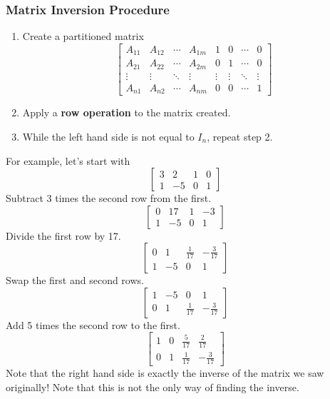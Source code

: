 \documentclass[10pt]{article}
\begin{document}
\subsubsection*{Matrix Inversion Procedure}
\begin{enumerate}
	\item Create a partitioned matrix
	\[\left[\begin{array}{cccc|cccc}
    A_{11} & A_{12} & \cdots & A_{1m} & 1 & 0 & \cdots & 0 \\
    A_{21} & A_{22} & \cdots & A_{2m} & 0 & 1 & \cdots & 0 \\
    \vdots & \vdots & \ddots & \vdots & \vdots & \vdots & \ddots & \vdots \\
    A_{n1} & A_{n2} & \cdots & A_{nm} & 0 & 0 & \cdots & 1
    \end{array}\right]\]
	\item Apply a \textbf{row operation} to the matrix created.
	\item While the left hand side is not equal to $I_n$, repeat step 2.
\end{enumerate}
For example, let's start with 
\[\left[\begin{array}{cc|cc} 3 & 2 & 1 & 0 \\ 1 & -5 & 0 & 1 \end{array}\right]\]
Subtract 3 times the second row from the first.
\[\left[\begin{array}{cc|cc} 0 & 17 & 1 & -3 \\ 1 & -5 & 0 & 1 \end{array}\right]\]
Divide the first row by 17.
\[\left[\begin{array}{cc|cc} 0 & 1 & \frac{1}{17} & -\frac{3}{17} \\ 1 & -5 & 0 & 1 \end{array}\right]\]
Swap the first and second rows.
\[\left[\begin{array}{cc|cc} 1 & -5 & 0 & 1 \\ 0 & 1 & \frac{1}{17} & -\frac{3}{17} \end{array}\right]\]
Add 5 times the second row to the first.
\[\left[\begin{array}{cc|cc} 1 & 0 & \frac{5}{17} & \frac{2}{17} \\ 0 & 1 & \frac{1}{17} & -\frac{3}{17} \end{array}\right]\]
Note that the right hand side is exactly the inverse of the matrix we saw originally!  Note that this is not the only way of finding the inverse.
\end{document}
